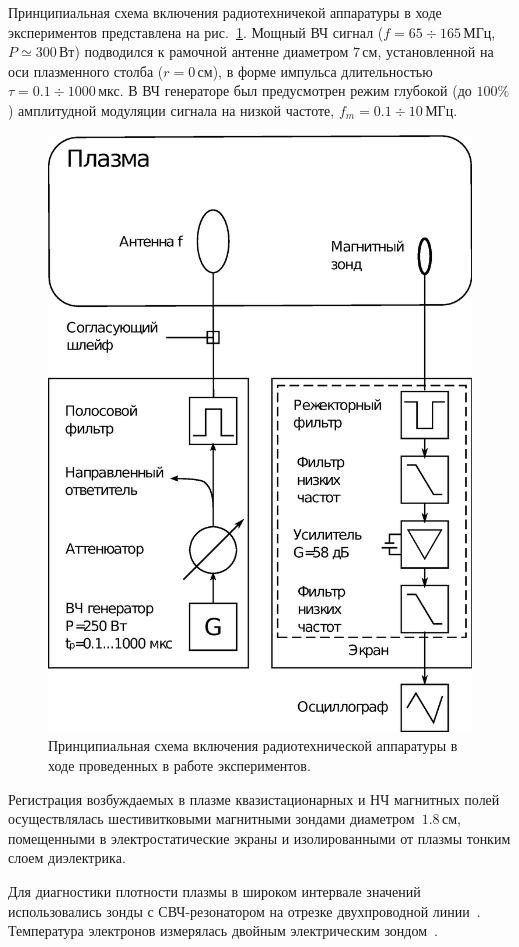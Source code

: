 \documentclass[10pt]{disser}
\begin{document}
Принципиальная схема включения радиотехничекой аппаратуры в ходе  экспериментов представлена на \mbox{рис.~\ref{fig:scheme_setup}}. Мощный ВЧ сигнал ($f=65\div{}165$\,МГц, $P\simeq300$\,Вт) подводился к рамочной антенне диаметром $7$\,см, установленной на оси плазменного столба ($r=0$\,см), в форме импульса длительностью $\tau=0.1\div1000$\,мкс. В ВЧ генераторе был предусмотрен режим глубокой (до $100\%$) амплитудной модуляции сигнала на низкой частоте, $f_m=0.1\div{}10$\,МГц. 
\begin{figure}[H]
    \centering
    \includegraphics*[width=0.7\columnwidth]{pics/scheme_setup.eps}
    \caption{Принципиальная схема включения радиотехнической аппаратуры в ходе проведенных в работе экспериментов.}
    \label{fig:scheme_setup}
 \end{figure}

Регистрация возбуждаемых в плазме квазистационарных и НЧ магнитных полей осуществлялась шестивитковыми магнитными зондами диаметром~$1.8$\,см, помещенными в электростатические экраны и изолированными от плазмы тонким слоем диэлектрика. 

Для диагностики плотности плазмы в широком интервале значений использовались зонды с СВЧ-резонатором на отрезке двухпроводной линии~\cite{Stenzel,Yanin}. Температура электронов измерялась двойным электрическим зондом~\cite{UHF_probe}. 
\end{document}
